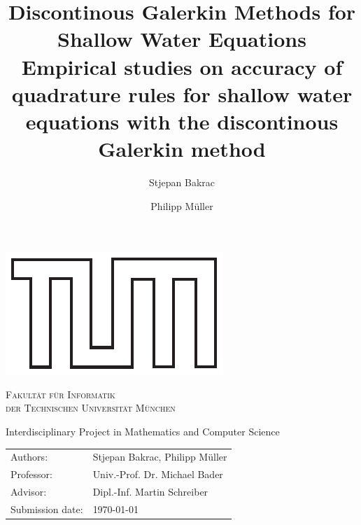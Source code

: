 \documentclass{article}
\title{Discontinous Galerkin Methods for Shallow Water Equations\\
  \vspace{.2cm}
\large{Empirical studies on accuracy of quadrature rules for shallow water equations with the discontinous Galerkin method}
}
\author{Stjepan Bakrac \and Philipp M\"uller}
\date{}
\begin{document}
\thispagestyle{empty}
\makeatletter
\begin{titlepage}
\begin{center}
  \includegraphics[scale=0.75]{TUM.pdf}
  
  \vspace{.5cm}
  \textsc{ \Large Fakultät für Informatik\\\vspace{.2cm}
    \large der Technischen Universität München}

  \vspace{1cm}

  \large Interdisciplinary Project in Mathematics and Computer Science

  \vspace{.4cm}

  \LARGE
  \@title

  \vspace{1cm}
  \vfill{}
  \begin{tabular}{ll}
    Authors: & Stjepan Bakrac, Philipp Müller \\
    Professor: & Univ.-Prof. Dr. Michael Bader \\
    Advisor: & Dipl.-Inf. Martin Schreiber \\
    Submission date: & \today
  \end{tabular}
  
  \vspace{1cm}

\end{center}
\end{titlepage}
\makeatother

\clearpage
\end{document}
